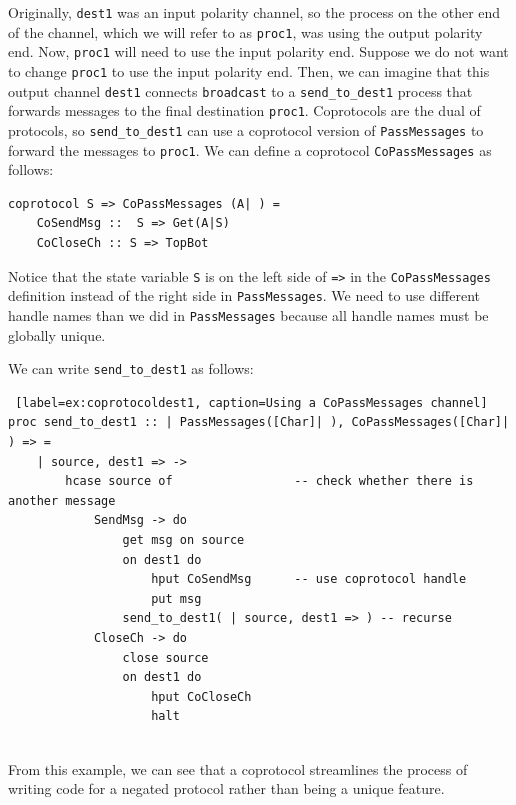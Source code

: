 \documentclass[11pt]{article}
\begin{document}
Originally,  \lstinline$dest1$ was an input polarity channel, so the process on the other end of the channel, which we will refer to as  \lstinline$proc1$, was using the output polarity end.
Now, \lstinline$proc1$ will need to use the input polarity end.
Suppose we do not want to change \lstinline$proc1$ to use the input polarity end.
Then, we can imagine that this output channel \lstinline$dest1$ connects \lstinline$broadcast$ to a \lstinline$send_to_dest1$ process that forwards messages to the final destination \lstinline$proc1$.
Coprotocols are the dual of protocols, so \lstinline$send_to_dest1$ can use a coprotocol version of \lstinline$PassMessages$ to forward the messages to \lstinline$proc1$.
We can define a coprotocol \lstinline$CoPassMessages$ as follows:
 \begin{lstlisting}
coprotocol S => CoPassMessages (A| ) =
    CoSendMsg ::  S => Get(A|S)
    CoCloseCh :: S => TopBot
\end{lstlisting}
Notice that the state variable \lstinline$S$ is on the left side of \lstinline$=>$ in the \lstinline$CoPassMessages$ definition instead of the right side in \lstinline$PassMessages$.
We need to use different handle names than we did in \lstinline$PassMessages$ because all handle names must be globally unique.

We can write \lstinline$send_to_dest1$ as follows:
\begin{lstlisting} [label=ex:coprotocoldest1, caption=Using a CoPassMessages channel] 
proc send_to_dest1 :: | PassMessages([Char]| ), CoPassMessages([Char]| ) => =
	| source, dest1 => -> 
		hcase source of					-- check whether there is another message
			SendMsg -> do
				get msg on source 		
				on dest1 do
					hput CoSendMsg		-- use coprotocol handle
					put msg
				send_to_dest1( | source, dest1 => ) -- recurse
			CloseCh -> do
				close source
				on dest1 do
					hput CoCloseCh
					halt
				
 \end{lstlisting}
 From this example, we can see that a coprotocol streamlines the process of writing code for a negated protocol rather than being a unique feature. 
\end{document}
